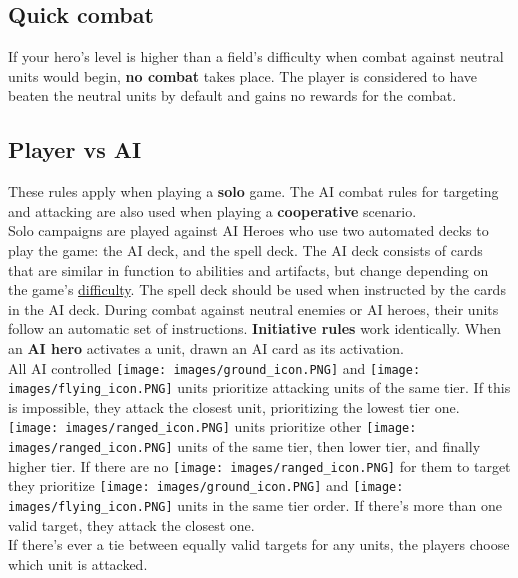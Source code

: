 \documentclass[12pt]{article}
\begin{document}
\subsection*{\hypertarget{Quick}{Quick combat}}
If your hero’s level is higher than a field’s difficulty when combat against neutral units would begin, \textbf{no combat} takes place. The player is considered to have beaten the neutral units by default and gains no rewards for the combat.

\subsection*{\hypertarget{AIrules}{Player vs AI}}
These rules apply when playing a \textbf{solo} game. The AI combat rules for targeting and attacking are also used when playing a \textbf{cooperative} scenario.\\[6pt]
Solo campaigns are played against AI Heroes who use two automated decks to play the game: the AI deck, and the spell deck. The AI deck consists of cards that are similar in function to abilities and artifacts, but change depending on the game's \hyperlink{Difficulty}{difficulty}. The spell deck should be used
when instructed by the cards in the AI deck. During combat against neutral enemies or AI heroes, their units follow an automatic set of instructions. \textbf{Initiative rules} work identically. When an \textbf{AI hero} activates a unit, drawn an AI card as its activation.\\[6pt]
All AI controlled \texttt{[image: images/ground\_icon.PNG]} and \texttt{[image: images/flying\_icon.PNG]} units prioritize attacking units of the same tier. If this is impossible, they attack the closest unit, prioritizing the lowest tier one. \texttt{[image: images/ranged\_icon.PNG]} units prioritize other \texttt{[image: images/ranged\_icon.PNG]} units of the same tier, then lower tier, and finally higher tier. If there are no \texttt{[image: images/ranged\_icon.PNG]} for them to target they prioritize \texttt{[image: images/ground\_icon.PNG]} and \texttt{[image: images/flying\_icon.PNG]} units in the same tier order. If there's more than one valid target, they attack the closest one.\\[6pt]
If there's ever a tie between equally valid targets for any units, the players choose which unit is attacked.
\end{document}
